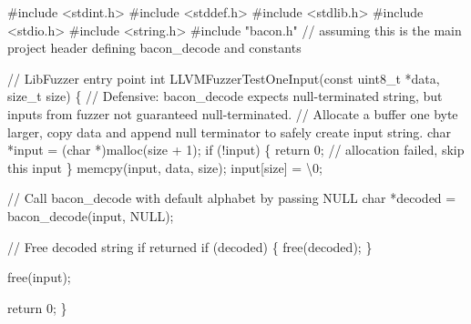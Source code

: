 \documentclass[
  a4paper,
]{scrreprt}
\newenvironment{Shaded}{\begin{snugshade}}{\end{snugshade}}
\newcommand{\CharTok}[1]{\textcolor[rgb]{0.00,0.50,0.00}{#1}}
\newcommand{\CommentTok}[1]{\textcolor[rgb]{0.41,0.41,0.41}{#1}}
\newcommand{\ControlFlowTok}[1]{\textcolor[rgb]{0.85,0.12,0.09}{#1}}
\newcommand{\DataTypeTok}[1]{\textcolor[rgb]{0.47,0.16,0.63}{#1}}
\newcommand{\DecValTok}[1]{\textcolor[rgb]{0.47,0.16,0.63}{#1}}
\newcommand{\ImportTok}[1]{\textcolor[rgb]{0.33,0.33,0.33}{#1}}
\newcommand{\NormalTok}[1]{\textcolor[rgb]{0.33,0.33,0.33}{#1}}
\newcommand{\OperatorTok}[1]{\textcolor[rgb]{0.00,0.46,0.62}{#1}}
\newcommand{\PreprocessorTok}[1]{\textcolor[rgb]{0.47,0.16,0.63}{#1}}
\newcommand{\SpecialCharTok}[1]{\textcolor[rgb]{0.00,0.46,0.62}{#1}}
\theoremstyle{definition}
\theoremstyle{remark}
\begin{document}
\begin{Shaded}
\begin{Highlighting}[numbers=left,,]
\PreprocessorTok{\#include }\ImportTok{\textless{}stdint.h\textgreater{}}
\PreprocessorTok{\#include }\ImportTok{\textless{}stddef.h\textgreater{}}
\PreprocessorTok{\#include }\ImportTok{\textless{}stdlib.h\textgreater{}}
\PreprocessorTok{\#include }\ImportTok{\textless{}stdio.h\textgreater{}}
\PreprocessorTok{\#include }\ImportTok{\textless{}string.h\textgreater{}}
\PreprocessorTok{\#include }\ImportTok{"bacon.h"}\PreprocessorTok{ }\CommentTok{// assuming this is the main project header defining bacon\_decode and constants}

\CommentTok{// LibFuzzer entry point}
\DataTypeTok{int}\NormalTok{ LLVMFuzzerTestOneInput}\OperatorTok{(}\DataTypeTok{const} \DataTypeTok{uint8\_t} \OperatorTok{*}\NormalTok{data}\OperatorTok{,} \DataTypeTok{size\_t}\NormalTok{ size}\OperatorTok{)} \OperatorTok{\{}
    \CommentTok{// Defensive: bacon\_decode expects null{-}terminated string, but inputs from fuzzer not guaranteed null{-}terminated.}
    \CommentTok{// Allocate a buffer one byte larger, copy data and append null terminator to safely create input string.}
    \DataTypeTok{char} \OperatorTok{*}\NormalTok{input }\OperatorTok{=} \OperatorTok{(}\DataTypeTok{char} \OperatorTok{*)}\NormalTok{malloc}\OperatorTok{(}\NormalTok{size }\OperatorTok{+} \DecValTok{1}\OperatorTok{);}
    \ControlFlowTok{if} \OperatorTok{(!}\NormalTok{input}\OperatorTok{)} \OperatorTok{\{}
        \ControlFlowTok{return} \DecValTok{0}\OperatorTok{;} \CommentTok{// allocation failed, skip this input}
    \OperatorTok{\}}
\NormalTok{    memcpy}\OperatorTok{(}\NormalTok{input}\OperatorTok{,}\NormalTok{ data}\OperatorTok{,}\NormalTok{ size}\OperatorTok{);}
\NormalTok{    input}\OperatorTok{[}\NormalTok{size}\OperatorTok{]} \OperatorTok{=} \CharTok{\textquotesingle{}}\SpecialCharTok{\textbackslash{}0}\CharTok{\textquotesingle{}}\OperatorTok{;}

    \CommentTok{// Call bacon\_decode with default alphabet by passing NULL}
    \DataTypeTok{char} \OperatorTok{*}\NormalTok{decoded }\OperatorTok{=}\NormalTok{ bacon\_decode}\OperatorTok{(}\NormalTok{input}\OperatorTok{,}\NormalTok{ NULL}\OperatorTok{);}

    \CommentTok{// Free decoded string if returned}
    \ControlFlowTok{if} \OperatorTok{(}\NormalTok{decoded}\OperatorTok{)} \OperatorTok{\{}
\NormalTok{        free}\OperatorTok{(}\NormalTok{decoded}\OperatorTok{);}
    \OperatorTok{\}}

\NormalTok{    free}\OperatorTok{(}\NormalTok{input}\OperatorTok{);}

    \ControlFlowTok{return} \DecValTok{0}\OperatorTok{;}
\OperatorTok{\}}
\end{Highlighting}
\end{Shaded}
\end{document}
